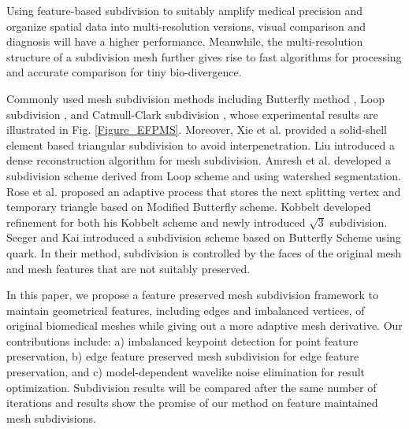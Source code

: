 \documentclass[10pt, conference, compsocconf]{IEEEtran}
\begin{document}
Using feature-based subdivision to suitably amplify medical precision and organize spatial data into multi-resolution versions, visual comparison and diagnosis will have a higher performance\cite{Tao2010Subdivision}. Meanwhile, the multi-resolution structure of a subdivision mesh further gives rise to fast algorithms for processing and accurate comparison for tiny bio-divergence.

Commonly used mesh subdivision methods including Butterfly method \cite{Zorin1996Interpolating}, Loop subdivision \cite{Loop1987Smooth}, and Catmull-Clark subdivision \cite{Catmull1978Recursively}, whose experimental results are illustrated in Fig. \ref{Figure_EFPMS}. Moreover, Xie et al. \cite{Xie2015Drape} provided a solid-shell element based triangular subdivision to avoid interpenetration. Liu \cite{Liu2014An} introduced a dense reconstruction algorithm for mesh subdivision. Amresh et al. \cite{Amresh2002Adaptive} developed a subdivision scheme derived from Loop scheme and using watershed segmentation. Rose et al. \cite{Rose2001On} proposed an adaptive process that stores the next splitting vertex and temporary triangle based on Modified Butterfly scheme. Kobbelt \cite{Kobbelt2000} developed refinement for both his Kobbelt scheme and newly introduced $\sqrt{3}$ subdivision. Seeger and Kai \cite{Seeger2001A} introduced a subdivision scheme based on Butterfly Scheme using quark. In their method, subdivision is controlled by the faces of the original mesh and mesh features that are not suitably preserved.

In this paper, we propose a feature preserved mesh subdivision framework to maintain geometrical features, including edges and imbalanced vertices, of original biomedical meshes while giving out a more adaptive mesh derivative. Our contributions include: a) imbalanced keypoint detection for point feature preservation, b) edge feature preserved mesh subdivision for edge feature preservation, and c) model-dependent wavelike noise elimination for result optimization. Subdivision results will be compared after the same number of iterations and results show the promise of our method on feature maintained mesh subdivisions.

\end{document}
